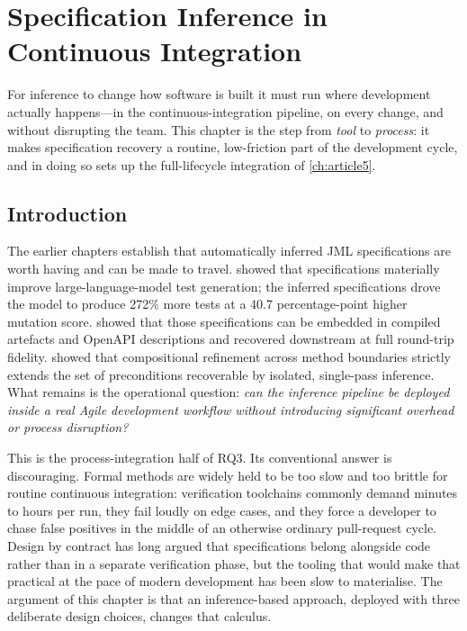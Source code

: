 \chapter{Specification Inference in Continuous Integration}\label{ch:article4}

For inference to change how software is built it must run where development
actually happens---in the continuous-integration pipeline, on every change, and
without disrupting the team. This chapter is the step from \emph{tool} to
\emph{process}: it makes specification recovery a routine, low-friction part of
the development cycle, and in doing so sets up the full-lifecycle integration of
\cref{ch:article5}.

\section{Introduction}
\label{sec:ci-introduction}

The earlier chapters establish that automatically inferred JML specifications are
worth having and can be made to travel.  showed that
specifications materially improve large-language-model test generation; the
inferred specifications drove the model to produce 272\% more tests at a 40.7
percentage-point higher mutation score.  showed that those
specifications can be embedded in compiled artefacts and OpenAPI descriptions and
recovered downstream at full round-trip fidelity.  showed that
compositional refinement across method boundaries strictly extends the set of
preconditions recoverable by isolated, single-pass inference. What remains is the
operational question: \emph{can the inference pipeline be deployed inside a real
Agile development workflow without introducing significant overhead or process
disruption?}

This is the process-integration half of RQ3. Its conventional answer is
discouraging. Formal methods are widely held to be too slow and too brittle for
routine continuous integration: verification toolchains commonly demand minutes
to hours per run, they fail loudly on edge cases, and they force a developer to
chase false positives in the middle of an otherwise ordinary pull-request cycle.
Design by contract \citep{meyer1992dbc} has long argued that specifications
belong alongside code rather than in a separate verification phase, but the
tooling that would make that practical at the pace of modern development has been
slow to materialise. The argument of this chapter is that an inference-based
approach, deployed with three deliberate design choices, changes that calculus.

